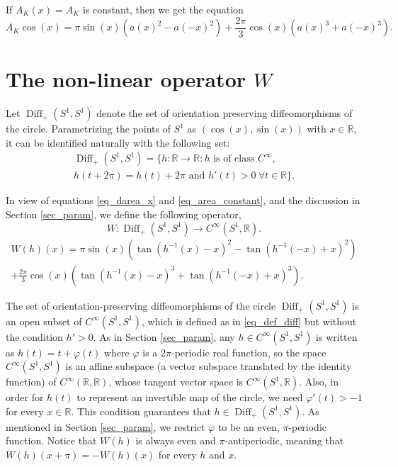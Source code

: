 \documentclass{amsart}
\def \R{\mathbb R}
\begin{document}
If $A_K(x) = A_K$ is constant, then we get the equation
\begin{equation}
	\label{eq_area_constant}
	A_K \cos(x) = \pi \sin(x) ( a(x)^2 - a(-x)^2 ) + \frac{2\pi}3 \cos(x) (a(x)^3 + a(-x)^3).
\end{equation}

\section{The non-linear operator $W$}
\label{sec_operatorW}

Let $\operatorname{Diff}_+(S^1, S^1)$ denote the set of orientation preserving diffeomorphisms of the circle.
Parametrizing the points of $S^1$ as $(\cos(x),\sin(x))$ with $x \in \R$, it can be identified naturally with the following set:
\begin{multline}
	\label{eq_def_diff}
	\operatorname{Diff}_+(S^1, S^1) = \{h: \R \to \R: \text{$h$ is of class $C^\infty$}, \\
	h(t+2\pi) = h(t) + 2\pi \text{ and } h'(t)>0\ \forall t\in\R \}.
\end{multline}

In view of equations \eqref{eq_darea_x} and \eqref{eq_area_constant}, and the discussion in Section \ref{sec_param}, we define the following operator,
\[
	W: \operatorname{Diff}_+(S^1, S^1) \to C^\infty(S^1,\R).
\]
\begin{multline}
	\label{eq_def_W}
	W(h)(x) = \pi \sin(x) \left( \tan(h^{-1}(x) - x )^2 - \tan(h^{-1}(-x)+x)^2\right) \\
	+ \frac{2\pi}3 \cos(x) \left( \tan(h^{-1}(x) - x )^3 + \tan(h^{-1}(-x)+x)^3\right) .
\end{multline}

The set of orientation-preserving diffeomorphisms of the circle $\operatorname{Diff}_+(S^1, S^1)$ is an open subset of $C^\infty(S^1, S^1)$, which is defined as in \eqref{eq_def_diff} but without the condition $h'>0$.
As in Section \ref{sec_param}, any $h \in C^\infty(S^1, S^1)$ is written as $h(t) = t + \varphi(t)$ where $\varphi$ is a $2\pi$-periodic real function, so the space $C^\infty(S^1, S^1)$ is an affine subspace (a vector subspace translated by the identity function) of $C^\infty(\R,\R)$, whose tangent vector space is $C^\infty(S^1, \R)$.
Also, in order for $h(t)$ to represent an invertible map of the circle, we need $\varphi'(t) > -1$ for every $x \in \R$. This condition guarantees that $h \in \operatorname{Diff}_+(S^1, S^1)$.
As mentioned in Section \ref{sec_param}, we restrict $\varphi$ to be an even, $\pi$-periodic function. Notice that $W(h)$ is always even and $\pi$-antiperiodic, meaning that $W(h)(x+\pi) = -W(h)(x)$ for every $h$ and $x$.
\end{document}
